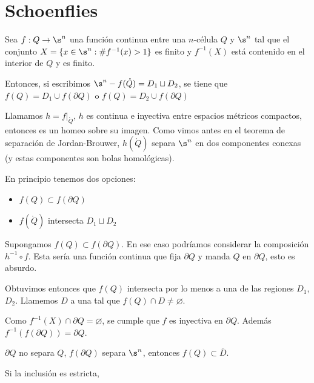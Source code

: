 \chapter{Schoenflies}


\begin{teo}
    Sea $f:Q\to \s^n$ una función continua entre una $n$-célula $Q$ y $\s^n$ tal que el conjunto $X=\{x\in\s^n :\# f^{-1}(x)> 1\}$ es finito y $f^{-1}(X)$ está contenido en el interior de $Q$ y es finito.

    Entonces, si escribimos $\s^n - f(\mathring{Q})= D_1\sqcup D_2$, se tiene que $f(Q)=D_1\cup f(\partial Q)$ o $f(Q)=D_2\cup f(\partial Q)$
\end{teo}

\begin{dem}

    Llamamos $h=f|_{\mathring{Q}}$, $h$ es continua e inyectiva entre espacios métricos compactos, entonces es un homeo sobre su imagen. Como vimos antes en el teorema de separación de Jordan-Brouwer, $h(\mathring{Q})$ separa $\s^n$ en dos componentes conexas (y estas componentes son bolas homológicas).

    En principio tenemos dos opciones:

    \begin{itemize}
        \item $f(Q)\subset f(\partial Q)$
        \item $f(\mathring{Q})$ intersecta $D_1\sqcup D_2$
    \end{itemize}
    
    Supongamos $f(Q)\subset f(\partial Q)$. En ese caso podríamos considerar la composición $h^{-1}\circ f$. Esta sería una función continua que fija $\partial Q$ y manda $Q$ en $\partial Q$, esto es absurdo. 
    

    Obtuvimos entonces que $f(Q)$ intersecta por lo menos a una de las regiones $D_1$, $D_2$. Llamemos $D$ a una tal que $f(Q)\cap D\neq\varnothing$.

    Como $f^{-1}(X)\cap\partial Q=\varnothing$, se cumple que $f$ es inyectiva en $\partial Q$. Además $f^{-1}(f(\partial Q))=\partial Q$. 

    $\partial{Q}$ no separa $Q$, $f(\partial{Q})$ separa $\s^n$, entonces $f(Q)\subset\overline{D}$. 

    Si la inclusión es estricta, 



\end{dem}

